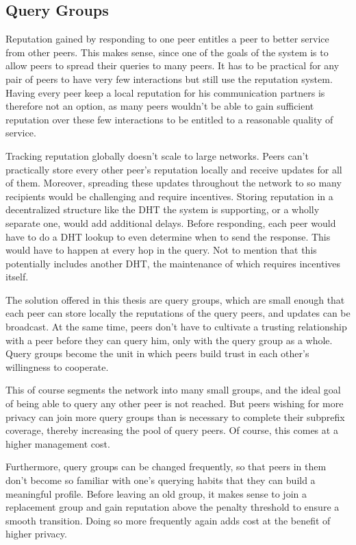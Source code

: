 \subsection{Query Groups}
Reputation gained by responding to one peer entitles a peer to better service
from other peers. This makes sense, since one of the goals of the system is to
allow peers to spread their queries to many peers. It has to be practical for
any pair of peers to have very few interactions but still use the reputation
system. Having every peer keep a local reputation for his communication partners
is therefore not an option, as many peers wouldn't be able to gain sufficient
reputation over these few interactions to be entitled to a reasonable quality of
service.

Tracking reputation globally doesn't scale to large networks. Peers can't
practically store every other peer's reputation locally and receive updates for
all of them. Moreover, spreading these updates throughout the network to so many
recipients would be challenging and require incentives. Storing reputation in a
decentralized structure like the \ac{DHT} the system is supporting, or a wholly
separate one, would add additional delays. Before responding, each peer would
have to do a \ac{DHT} lookup to even determine when to send the response. This
would have to happen at every hop in the query. Not to mention that this
potentially includes another \ac{DHT}, the maintenance of which requires
incentives itself.

The solution offered in this thesis are query groups, which are small enough
that each peer can store locally the reputations of the query peers, and updates
can be broadcast. At the same time, peers don't have to cultivate a trusting
relationship with a peer before they can query him, only with the query group as
a whole. Query groups become the unit in which peers build trust in each other's
willingness to cooperate.

This of course segments the network into many small groups, and the ideal goal
of being able to query any other peer is not reached. But peers wishing for more
privacy can join more query groups than is necessary to complete their subprefix
coverage, thereby increasing the pool of query peers. Of course, this comes at a
higher management cost.

Furthermore, query groups can be changed frequently, so that peers in them don't
become so familiar with one's querying habits that they can build a meaningful
profile. Before leaving an old group, it makes sense to join a replacement group
and gain reputation above the penalty threshold to ensure a smooth transition.
Doing so more frequently again adds cost at the benefit of higher privacy.

